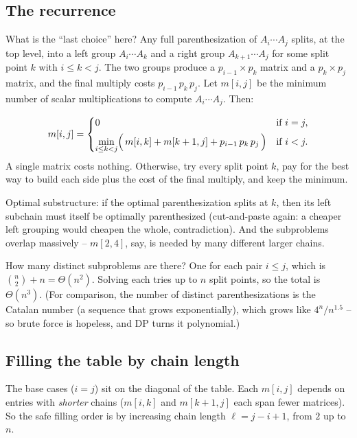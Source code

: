 \subsection{The recurrence}

What is the ``last choice'' here? Any full parenthesization of
$A_i \cdots A_j$ splits, at the top level, into a left group
$A_i \cdots A_k$ and a right group $A_{k+1} \cdots A_j$ for some split point
$k$ with $i \le k < j$. The two groups produce a $p_{i-1}\times p_k$ matrix and
a $p_k \times p_j$ matrix, and the final multiply costs
$p_{i-1}\,p_k\,p_j$. Let $m[i,j]$ be the minimum number of scalar
multiplications to compute $A_i \cdots A_j$. Then:

\begin{focusbox}
\[
  m[i,j] =
  \begin{cases}
    0 & \text{if } i = j,\\[4pt]
    \displaystyle \min_{i \le k < j}\Bigl(\, m[i,k] + m[k+1,j] + p_{i-1}\,p_k\,p_j \,\Bigr) & \text{if } i < j.
  \end{cases}
\]
A single matrix costs nothing. Otherwise, try every split point $k$, pay for
the best way to build each side plus the cost of the final multiply, and keep
the minimum.
\end{focusbox}

Optimal substructure: if the optimal parenthesization splits at $k$, then its
left subchain must itself be optimally parenthesized (cut-and-paste again: a
cheaper left grouping would cheapen the whole, contradiction). And the
subproblems overlap massively -- $m[2,4]$, say, is needed by many different
larger chains.

How many distinct subproblems are there? One for each pair $i \le j$, which is
$\binom{n}{2} + n = \Theta(n^2)$. Solving each tries up to $n$ split points, so
the total is $\Theta(n^3)$. (For comparison, the number of distinct
parenthesizations is the Catalan number (a sequence that grows exponentially), which grows like $4^n/n^{1.5}$ -- so
brute force is hopeless, and DP turns it polynomial.)

\subsection{Filling the table by chain length}

The base cases ($i=j$) sit on the diagonal of the table. Each $m[i,j]$ depends
on entries with \emph{shorter} chains ($m[i,k]$ and $m[k+1,j]$ each span fewer
matrices). So the safe filling order is by increasing chain length
$\ell = j - i + 1$, from $2$ up to $n$.

